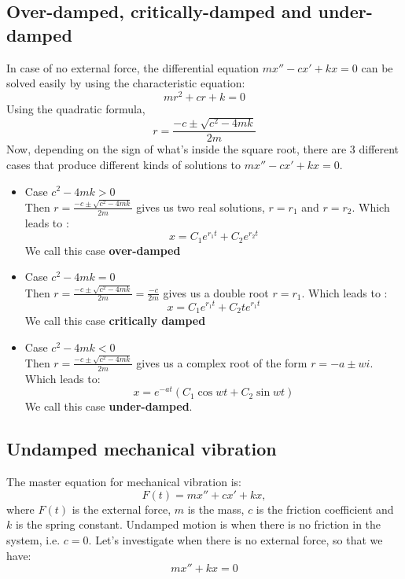 \documentclass[12pt]{report}
\begin{document}
\subsection*{Over-damped, critically-damped and under-damped}

In case of no external force, the differential equation $m x'' -c x' + kx=0$ can be solved easily by using the characteristic equation:
$$mr^2 + cr +k =0$$
Using the quadratic formula,
$$r = \frac{-c \pm \sqrt{c^2 -4mk}}{2m}$$
Now, depending on the sign of what's inside the square root, there are 3 different cases that produce different kinds of solutions to $m x'' -c x' + kx=0$.

\begin{itemize}
	\item Case $c^2 -4mk>0$ \\
Then $r = \frac{-c \pm \sqrt{c^2 -4mk}}{2m}$ gives us two real solutions, $r= r_1$ and $r = r_2$. Which leads to :
$$x = C_1 e^{r_1 t}+C_2 e^{r_2 t}$$
We call this case \textbf{over-damped}

\item Case $c^2 -4mk=0$ \\
Then $r = \frac{-c \pm \sqrt{c^2 -4mk}}{2m}=\frac{-c}{2m}$ gives us a double root $r= r_1$. Which leads to :
$$x = C_1 e^{r_1 t}+C_2 t e^{r_1 t}$$
We call this case \textbf{critically damped}

\item Case $c^2 -4mk<0$ \\
Then $r = \frac{-c \pm \sqrt{c^2 -4mk}}{2m}$ gives us a complex root of the form $r= -a\pm wi$. Which leads to:
$$x = e^{-at} (C_1 \cos wt + C_2 \sin wt) $$
We call this case \textbf{under-damped}.

\end{itemize}

\subsection*{Undamped mechanical vibration}

The master equation for mechanical vibration is:
$$F(t) = mx'' + cx'+kx,$$
where $F(t)$ is the external force, $m$ is the mass, $c$ is the friction coefficient and $k$ is the spring constant.
Undamped motion is when there is no friction in the system, i.e. $c=0$. Let's investigate when there is no external force, so that we have:
$$m x'' + kx =0$$
\end{document}
